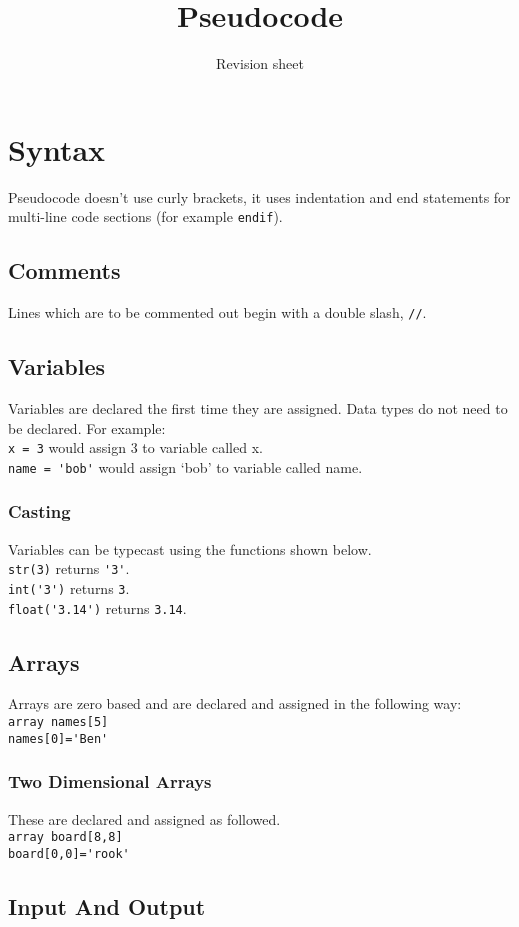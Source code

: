 \documentclass[a4paper,11pt]{article}
\title{Pseudocode}
\author{Revision sheet}
\date{}
\begin{document}
\maketitle
\thispagestyle{fancy}

\section{Syntax}
Pseudocode doesn't use curly brackets, it uses indentation and end statements for multi-line code sections (for example \verb|endif|).
\subsection{Comments}
Lines which are to be commented out begin with a double slash, \verb|//|.
\subsection{Variables}
Variables are declared the first time they are assigned. Data types do not need to be declared. For example:\\
\verb|x = 3| would assign 3 to variable called x.\\
\verb|name = 'bob'| would assign `bob' to variable called name.
\subsubsection{Casting}
Variables can be typecast using the functions shown below.\\
\verb|str(3)| returns \verb|'3'|.\\
\verb|int('3')| returns \verb|3|.\\
\verb|float('3.14')| returns \verb|3.14|.
\subsection{Arrays}
Arrays are zero based and are declared and assigned in the following way:\\
\verb|array names[5]|\\
\verb|names[0]='Ben'|
\subsubsection{Two Dimensional Arrays}
These are declared and assigned as followed.\\
\verb|array board[8,8]|\\
\verb|board[0,0]='rook'|
\subsection{Input And Output}
\end{document}
